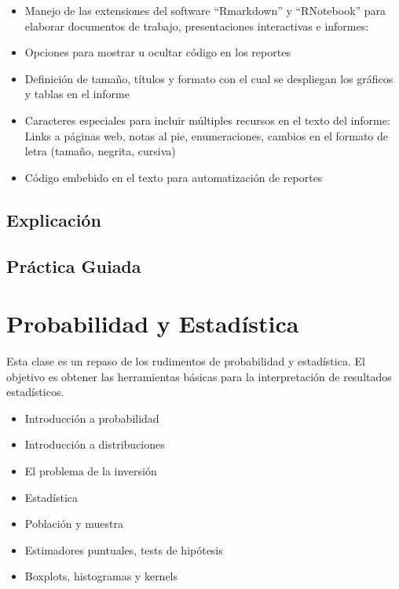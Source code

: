 \documentclass[]{book}
\providecommand{\tightlist}{%
  \setlength{\itemsep}{0pt}\setlength{\parskip}{0pt}}
\begin{document}
\begin{itemize}
\tightlist
\item
  Manejo de las extensiones del software ``Rmarkdown'' y ``RNotebook'' para elaborar documentos de trabajo, presentaciones interactivas e informes:
\item
  Opciones para mostrar u ocultar código en los reportes
\item
  Definición de tamaño, títulos y formato con el cual se despliegan los gráficos y tablas en el informe
\item
  Caracteres especiales para incluir múltiples recursos en el texto del informe: Links a páginas web, notas al pie, enumeraciones, cambios en el formato de letra (tamaño, negrita, cursiva)
\item
  Código embebido en el texto para automatización de reportes
\end{itemize}

\hypertarget{explicacion-4}{%
\section{Explicación}\label{explicacion-4}}

\hypertarget{practica-guiada-4}{%
\section{Práctica Guiada}\label{practica-guiada-4}}

\hypertarget{probabilidad-y-estadistica}{%
\chapter{Probabilidad y Estadística}\label{probabilidad-y-estadistica}}

Esta clase es un repaso de los rudimentos de probabilidad y estadística. El objetivo es obtener las herramientas básicas para la interpretación de resultados estadísticos.

\begin{itemize}
\tightlist
\item
  Introducción a probabilidad
\item
  Introducción a distribuciones
\item
  El problema de la inversión
\item
  Estadística
\item
  Población y muestra
\item
  Estimadores puntuales, tests de hipótesis
\item
  Boxplots, histogramas y kernels
\end{itemize}
\end{document}
